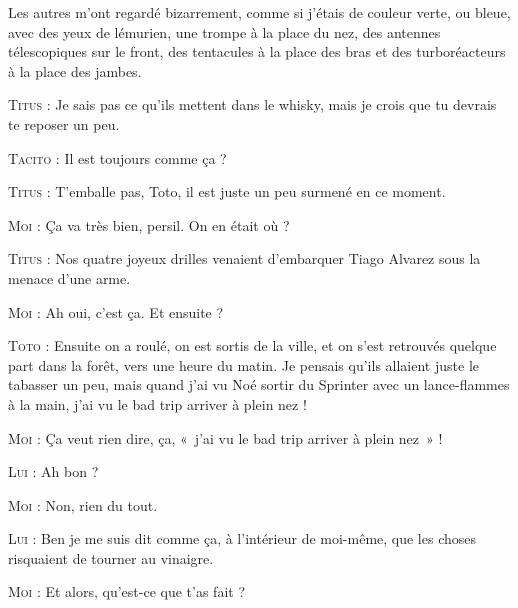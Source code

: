 Les autres m’ont regardé bizarrement, comme si j’étais de couleur verte, ou bleue, avec des yeux de lémurien, une trompe à la place du nez, des antennes télescopiques sur le front, des tentacules à la place des bras et des turboréacteurs à la place des jambes.

\begin{dialogue}

\textsc{Titus} : Je sais pas ce qu’ils mettent dans le whisky, mais je crois que tu devrais te reposer un peu.

\textsc{Tacito} : Il est toujours comme ça ?

\textsc{Titus} : T’emballe pas, Toto, il est juste un peu surmené en ce moment.

\textsc{Moi} : Ça va très bien, persil. On en était où ?

\textsc{Titus} : Nos quatre joyeux drilles venaient d’embarquer Tiago Alvarez sous la menace d’une arme.

\textsc{Moi} : Ah oui, c’est ça. Et ensuite ?

\textsc{Toto} : Ensuite on a roulé, on est sortis de la ville, et on s’est retrouvés quelque part dans la forêt, vers une heure du matin. Je pensais qu’ils allaient juste le tabasser un peu, mais quand j’ai vu Noé sortir du Sprinter avec un lance-flammes à la main, j’ai vu le bad trip arriver à plein nez !

\textsc{Moi} : Ça veut rien dire, ça, «~j’ai vu le bad trip arriver à plein nez~» !

\textsc{Lui} : Ah bon ?

\textsc{Moi} : Non, rien du tout.

\textsc{Lui} : Ben je me suis dit comme ça, à l’intérieur de moi-même, que les choses risquaient de tourner au vinaigre.

\textsc{Moi} : Et alors, qu’est-ce que t’as fait ?


\end{dialogue}
